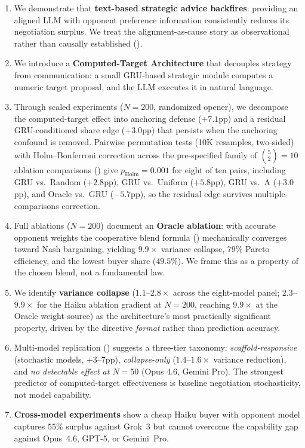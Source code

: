 \documentclass[11pt,a4paper]{article}
\begin{document}
\begin{enumerate}
\item We demonstrate that \textbf{text-based strategic advice backfires}: providing an aligned LLM with opponent preference information consistently reduces its negotiation surplus. We treat the alignment-as-cause story as observational rather than causally established ().
\item We introduce a \textbf{Computed-Target Architecture} that decouples strategy from communication: a small GRU-based strategic module computes a numeric target proposal, and the LLM executes it in natural language.
\item Through scaled experiments ($N = 200$, randomized opener), we decompose the computed-target effect into anchoring defense ($+7.1$pp) and a residual GRU-conditioned share edge ($+3.0$pp) that persists when the anchoring confound is removed. Pairwise permutation tests (10K resamples, two-sided) with Holm--Bonferroni correction across the pre-specified family of $\binom{5}{2}\!=\!10$ ablation comparisons () give $p_{\text{Holm}} = 0.001$ for eight of ten pairs, including GRU vs.\ Random ($+2.8$pp), GRU vs.\ Uniform ($+5.8$pp), GRU vs.\ A ($+3.0$pp), and Oracle vs.\ GRU ($-5.7$pp), so the residual edge survives multiple-comparisons correction.
\item Full ablations ($N = 200$) document an \textbf{Oracle ablation}: with accurate opponent weights the cooperative blend formula () mechanically converges toward Nash bargaining, yielding $9.9\times$ variance collapse, $79\%$ Pareto efficiency, and the lowest buyer share ($49.5\%$). We frame this as a property of the chosen blend, not a fundamental law.
\item We identify \textbf{variance collapse} ($1.1$--$2.8\times$ across the eight-model panel; $2.3$--$9.9\times$ for the Haiku ablation gradient at $N\!=\!200$, reaching $9.9\times$ at the Oracle weight source) as the architecture's most practically significant property, driven by the directive \emph{format} rather than prediction accuracy.
\item Multi-model replication () suggests a three-tier taxonomy: \emph{scaffold-responsive} (stochastic models, $+3$--$7$pp), \emph{collapse-only} ($1.4$--$1.6\times$ variance reduction), and \emph{no detectable effect at $N\!=\!50$} (Opus 4.6, Gemini Pro). The strongest predictor of computed-target effectiveness is baseline negotiation stochasticity, not model capability.
\item \textbf{Cross-model experiments} show a cheap Haiku buyer with opponent model captures $55\%$ surplus against Grok~3 but cannot overcome the capability gap against Opus~4.6, GPT-5, or Gemini~Pro.

\end{enumerate}
\end{document}
